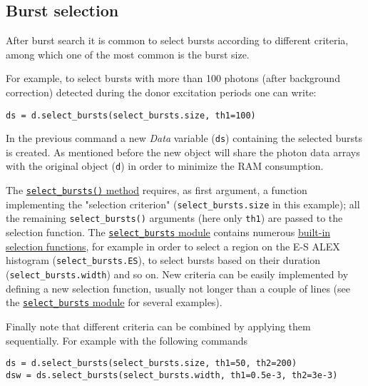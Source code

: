 \subsection{Burst selection}
\label{sec:burstsel}

After burst search it is common to select bursts according to different
criteria, among which one of the most common is the burst size.

For example, to select bursts with more than 100 photons (after background
correction) detected during the donor excitation periods one can write:

\begin{verbatim}
ds = d.select_bursts(select_bursts.size, th1=100)
\end{verbatim}

In the previous command a new \textit{Data} variable (\verb|ds|) containing the selected
bursts is created. As mentioned before the new object will share the photon data
arrays with the original object (\verb|d|) in order to minimize the RAM
consumption.

The
\href{http://fretbursts.readthedocs.org/en/latest/data_class.html#burst-selection-methods}{\texttt{select\_bursts()} method}
requires, as first argument, a function implementing the "selection criterion" (\verb|select_bursts.size| 
in this example); all the remaining \verb|select_bursts()| arguments (here only \verb|th1|) are passed to the selection function. The
\href{http://fretbursts.readthedocs.org/en/latest/burst_selection.html}{\texttt{select\_bursts} module} 
contains numerous 
\href{http://fretbursts.readthedocs.org/en/latest/burst_selection.html#module-fretbursts.select_bursts}{built-in selection functions}, 
for example in order to select a region on the E-S ALEX histogram (\verb|select_bursts.ES|), 
to select bursts based on their duration (\verb|select_bursts.width|) and so on.
New criteria can be easily implemented by defining a new selection function, usually 
not longer than a couple of lines (see the
\href{https://github.com/tritemio/FRETBursts/blob/master/fretbursts/select\_bursts.py}{\texttt{select\_bursts} module} for several examples).

Finally note that different criteria can be combined by applying them sequentially. 
For example with the following commands

\begin{verbatim}
ds = d.select_bursts(select_bursts.size, th1=50, th2=200)
dsw = ds.select_bursts(select_bursts.width, th1=0.5e-3, th2=3e-3)
\end{verbatim}

